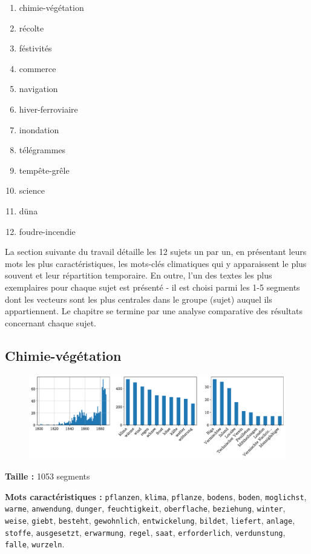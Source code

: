 \documentclass[a4paper,twoside,12pt]{article}
\begin{document}
\vspace{1ex}
\begin{enumerate}
    \item chimie-végétation
    \item récolte
    \item féstivités
    \item commerce
    \item navigation
    \item hiver-ferroviaire
    \item inondation
    \item télégrammes
    \item tempête-grêle
    \item science
    \item düna
    \item foudre-incendie
\end{enumerate}
\vspace{2ex}

La section suivante du travail détaille les 12 sujets un par un, en présentant leurs mots les plus caractéristiques, les mots-clés climatiques qui y apparaissent le plus souvent et leur répartition temporaire. En outre, l'un des textes les plus exemplaires pour chaque sujet est présenté - il est choisi parmi les 1-5 segments dont les vecteurs sont les plus centrales dans le groupe (sujet) auquel ils appartiennent. Le chapitre se termine par une analyse comparative des résultats concernant chaque sujet.

\clearpage


\subsection{Chimie-végétation} \label{topic1_chimie-vegetation}

\begin{figure}[H]
\centering
\includegraphics[width=\textwidth]{images/topic_charts_1.pdf}
\end{figure}

\begin{flushleft}
\textbf{Taille :} 1053 segments

\textbf{Mots caractéristiques :} \texttt{pflanzen}, \texttt{klima}, \texttt{pflanze}, \texttt{bodens}, \texttt{boden}, \texttt{moglichst}, \texttt{warme}, \texttt{anwendung}, \texttt{dunger}, \texttt{feuchtigkeit}, \texttt{oberflache}, \texttt{beziehung}, \texttt{winter}, \texttt{weise}, \texttt{giebt}, \texttt{besteht}, \texttt{gewohnlich}, \texttt{entwickelung}, \texttt{bildet}, \texttt{liefert}, \texttt{anlage}, \texttt{stoffe}, \texttt{ausgesetzt}, \texttt{erwarmung}, \texttt{regel}, \texttt{saat}, \texttt{erforderlich}, \texttt{verdunstung}, \texttt{falle}, \texttt{wurzeln}.
\end{flushleft}
\end{document}
